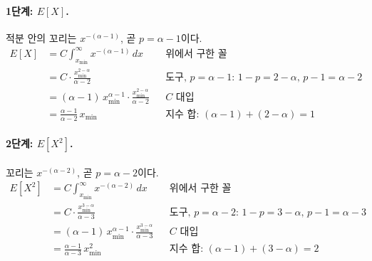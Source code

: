 \documentclass[11pt]{article}
\begin{document}
\paragraph{1단계: $E[X]$.} 적분 안의 꼬리는 $x^{-(\alpha-1)}$, 곧 $p = \alpha - 1$이다.
\begin{align*}
  E[X] &= C \int_{x_{\min}}^{\infty} x^{-(\alpha-1)}\,dx
    && \text{위에서 구한 꼴}\\
       &= C \cdot \frac{x_{\min}^{2-\alpha}}{\alpha-2}
    && \text{도구, $p = \alpha-1$: $1-p = 2-\alpha$, $p-1 = \alpha-2$}\\
       &= (\alpha-1)\,x_{\min}^{\alpha-1} \cdot \frac{x_{\min}^{2-\alpha}}{\alpha-2}
    && \text{$C$ 대입}\\
       &= \frac{\alpha-1}{\alpha-2}\,x_{\min}
    && \text{지수 합: $(\alpha-1)+(2-\alpha) = 1$}
\end{align*}

\paragraph{2단계: $E[X^2]$.} 꼬리는 $x^{-(\alpha-2)}$, 곧 $p = \alpha - 2$이다.
\begin{align*}
  E[X^2] &= C \int_{x_{\min}}^{\infty} x^{-(\alpha-2)}\,dx
    && \text{위에서 구한 꼴}\\
         &= C \cdot \frac{x_{\min}^{3-\alpha}}{\alpha-3}
    && \text{도구, $p = \alpha-2$: $1-p = 3-\alpha$, $p-1 = \alpha-3$}\\
         &= (\alpha-1)\,x_{\min}^{\alpha-1} \cdot \frac{x_{\min}^{3-\alpha}}{\alpha-3}
    && \text{$C$ 대입}\\
         &= \frac{\alpha-1}{\alpha-3}\,x_{\min}^2
    && \text{지수 합: $(\alpha-1)+(3-\alpha) = 2$}
\end{align*}
\end{document}
